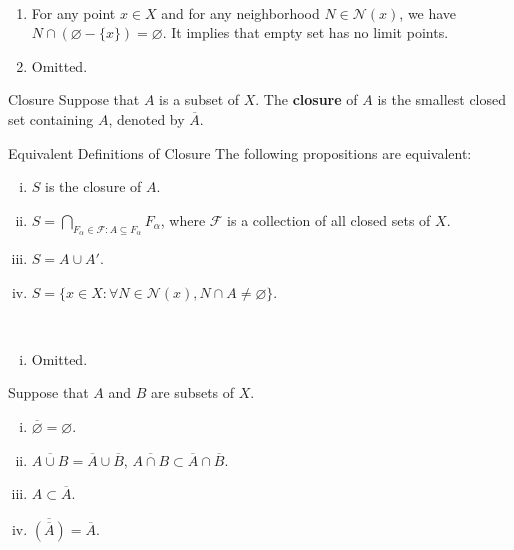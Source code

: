 \documentclass{report}
\begin{document}
\begin{prf}~\\ \vspace{-1em}
	\begin{enumerate}
		\item For any point $x\in X$ and for any neighborhood $N\in\mathcal{N}(x)$, we have $N\cap(\varnothing-\{x\})=\varnothing$. It implies that empty set has no limit points.
		\item Omitted.
	\end{enumerate}
\end{prf}


\begin{definition}{Closure}{}
	Suppose that $A$ is a subset of $X$. The \textbf{closure} of $A$ is the smallest closed set containing $A$, denoted by $\overline{A}$.
\end{definition}


\begin{proposition}{Equivalent Definitions of Closure}{}
	The following propositions are equivalent:
	\begin{enumerate}[(i)] 
		\item $S$ is the closure of $A$.
		\item $S=\bigcap\limits_{F_\alpha\in\mathcal{F}:A\subseteq F_\alpha}F_\alpha$, where $\mathcal{F}$ is a collection of all closed sets of $X$.
		\item $S=A\cup A'$.
		\item $S=\{x\in X: \forall N\in\mathcal{N}(x),N\cap A\ne\varnothing\}$.
	\end{enumerate}
\end{proposition}


\begin{prf}~\\ \vspace{-1em}
	\begin{enumerate}[(i)] 
		\item Omitted.
	\end{enumerate}
\end{prf}

\begin{proposition}{}{}
	Suppose that $A$ and $B$ are subsets of $X$.
	\begin{enumerate}[(i)] 
		\item $\overline{\varnothing}=\varnothing$.
		\item $\overline{A \cup B}=\overline{A}\cup\overline{B}$,  $\overline{A \cap B}\subset\overline{A}\cap\overline{B}$.
		\item $A\subset\overline{A}$.
		\item $\overline{\left(\overline{A}\right)}=\overline{A}$.
	\end{enumerate}
\end{proposition}
\end{document}
